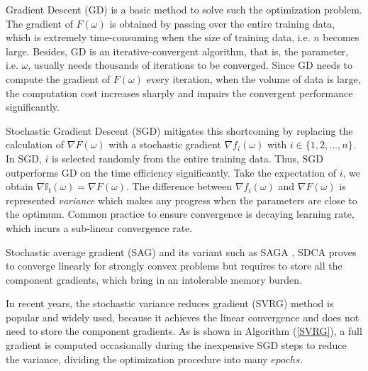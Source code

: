 \documentclass[conference]{IEEEtran}
\begin{document}
Gradient Descent (GD) is a basic method to solve such the optimization problem. The gradient of $F(\omega)$  is obtained by passing over the entire training data, which is extremely time-consuming when the size of training data, i.e. $n$ becomes large.  Besides, GD is an iterative-convergent algorithm, that is, the parameter, i.e. $\omega$, usually needs thousands of iterations to be converged.   Since GD needs to compute the  gradient of  $F(\omega)$ every iteration, when the volume of data is large, the computation cost increases sharply and impairs the convergent performance significantly. 

Stochastic Gradient Descent (SGD) mitigates this shortcoming by replacing the calculation of $\nabla F(\omega)$ with a stochastic gradient $\nabla f_i(\omega)$ with $i\in\{1,2, ..., n\}$. In SGD, $i$ is selected randomly  from the entire training data. Thus, SGD outperforms GD on the time efficiency significantly. Take the expectation of $i$, we obtain $\mathbb{\nabla f_i(\omega)} = \nabla F(\omega)$. The difference between $\nabla f_i(\omega)$ and  $\nabla F(\omega)$ is represented \emph{variance} which makes any progress when the parameters are close to the optimum. Common practice to ensure convergence is decaying learning rate, which incurs a sub-linear convergence rate.

Stochastic average gradient (SAG) \citep{Schmidt:2013ui} and its variant such as SAGA \citep{Defazio:2014vu}, SDCA \citep{ShalevShwartz:2016vy} proves to converge linearly for strongly convex problems but requires to store all the component gradients, which bring in an intolerable memory burden. 

In recent years, the stochastic variance reduces gradient (SVRG) \citep{Johnson:9MAvkbgy} method is popular and widely used, because it achieves the linear convergence and does not need to store the component gradients. As is shown in Algorithm (\ref{SVRG}), a full gradient is computed occasionally during the inexpensive SGD steps to reduce the variance, dividing the optimization procedure into many $epochs$.
\end{document}
